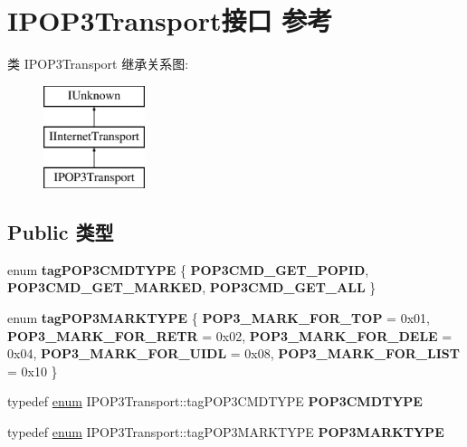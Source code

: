 \hypertarget{class_i_p_o_p3_transport}{}\section{I\+P\+O\+P3\+Transport接口 参考}
\label{class_i_p_o_p3_transport}
类 I\+P\+O\+P3\+Transport 继承关系图\+:\begin{figure}[H]
\begin{center}
\leavevmode
\includegraphics[height=3.000000cm]{class_i_p_o_p3_transport}
\end{center}
\end{figure}
\subsection*{Public 类型}
\begin{DoxyCompactItemize}
\item 
\mbox{\label{class_i_p_o_p3_transport_ae1c71ed4a95a1ff9da1e0d6ee7686287}} 
enum {\bfseries tag\+P\+O\+P3\+C\+M\+D\+T\+Y\+PE} \{ {\bfseries P\+O\+P3\+C\+M\+D\+\_\+\+G\+E\+T\+\_\+\+P\+O\+P\+ID}, 
{\bfseries P\+O\+P3\+C\+M\+D\+\_\+\+G\+E\+T\+\_\+\+M\+A\+R\+K\+ED}, 
{\bfseries P\+O\+P3\+C\+M\+D\+\_\+\+G\+E\+T\+\_\+\+A\+LL}
 \}
\item 
\mbox{\label{class_i_p_o_p3_transport_ad33bf746735cf20b20ca4abc64ce46dd}} 
enum {\bfseries tag\+P\+O\+P3\+M\+A\+R\+K\+T\+Y\+PE} \{ \newline
{\bfseries P\+O\+P3\+\_\+\+M\+A\+R\+K\+\_\+\+F\+O\+R\+\_\+\+T\+OP} = 0x01, 
{\bfseries P\+O\+P3\+\_\+\+M\+A\+R\+K\+\_\+\+F\+O\+R\+\_\+\+R\+E\+TR} = 0x02, 
{\bfseries P\+O\+P3\+\_\+\+M\+A\+R\+K\+\_\+\+F\+O\+R\+\_\+\+D\+E\+LE} = 0x04, 
{\bfseries P\+O\+P3\+\_\+\+M\+A\+R\+K\+\_\+\+F\+O\+R\+\_\+\+U\+I\+DL} = 0x08, 
\newline
{\bfseries P\+O\+P3\+\_\+\+M\+A\+R\+K\+\_\+\+F\+O\+R\+\_\+\+L\+I\+ST} = 0x10
 \}
\item 
\mbox{\label{class_i_p_o_p3_transport_a617289750e2f8202836d361ef89e000f}} 
typedef \hyperlink{interfaceenum}{enum} I\+P\+O\+P3\+Transport\+::tag\+P\+O\+P3\+C\+M\+D\+T\+Y\+PE {\bfseries P\+O\+P3\+C\+M\+D\+T\+Y\+PE}
\item 
\mbox{\label{class_i_p_o_p3_transport_a8921dc81277d5feae21c10ca0aee2123}} 
typedef \hyperlink{interfaceenum}{enum} I\+P\+O\+P3\+Transport\+::tag\+P\+O\+P3\+M\+A\+R\+K\+T\+Y\+PE {\bfseries P\+O\+P3\+M\+A\+R\+K\+T\+Y\+PE}
\end{DoxyCompactItemize}
